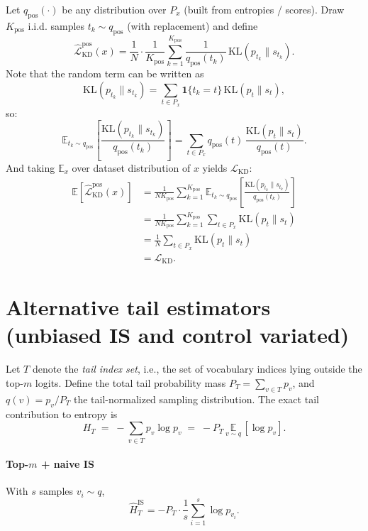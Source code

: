 \documentclass[11pt]{article}
\begin{document}
Let \(q_{\text{pos}}(\cdot)\) be any distribution over \(P_x\) (built from entropies / scores).
Draw \(K_{\text{pos}}\) i.i.d. samples \(t_k\sim q_{\text{pos}}\) (with replacement) and define
\[
	\widehat{\mathcal{L}}_{\text{KD}}^{\text{pos}}(x)
	=\frac{1}{N}\cdot\frac{1}{K_{\text{pos}}}\sum_{k=1}^{K_{\text{pos}}}
	\frac{1}{q_{\text{pos}}(t_k)}\,\mathrm{KL}(p_{t_k}\|s_{t_k}).
\]
Note that the random term can be written as
\[
	\mathrm{KL}(p_{t_k}\|s_{t_k})
	=\sum_{t\in P_x}\mathbf{1}\!\{t_k=t\}\,\mathrm{KL}(p_t\|s_t),
\]
so:
\[
	\mathbb{E}_{t_k\sim q_{\text{pos}}}\!\left[
		\frac{\mathrm{KL}(p_{t_k}\|s_{t_k})}{q_{\text{pos}}(t_k)}
		\right]
	= \sum_{t\in P_x} q_{\text{pos}}(t)\,
	\frac{\mathrm{KL}(p_t\|s_t)}{q_{\text{pos}}(t)}.
\]
And taking \(\mathbb{E}_x\) over dataset distribution of \(x\) yields \(\mathcal{L}_{\text{KD}}\):
\begin{align*}
	\mathbb{E}\!\left[\widehat{\mathcal{L}}_{\text{KD}}^{\text{pos}}(x)\right]
	 & = \frac{1}{N K_{\text{pos}}}\sum_{k=1}^{K_{\text{pos}}}
	\mathbb{E}_{t_k\sim q_{\text{pos}}}\!\left[
		\frac{\mathrm{KL}(p_{t_k}\|s_{t_k})}{q_{\text{pos}}(t_k)}
	\right]                                                    \\
	 & = \frac{1}{N K_{\text{pos}}}\sum_{k=1}^{K_{\text{pos}}}
	\sum_{t\in P_x}\mathrm{KL}(p_t\|s_t)                       \\
	 & = \frac{1}{N}\sum_{t\in P_x}\mathrm{KL}(p_t\|s_t)       \\
	 & =\mathcal{L}_{\text{KD}}.
\end{align*}

\section{Alternative tail estimators (unbiased IS and control variated)}
\label{app:tail-IS}
Let \(T\) denote the \emph{tail index set}, i.e., the set of vocabulary indices lying outside the top-\(m\) logits.
Define the total tail probability mass $P_T=\sum_{v\in T}p_v$, and $q(v)=p_v/P_T$ the tail-normalized sampling distribution. The exact tail contribution to entropy is
\[
	H_T \;=\; -\sum_{v\in T} p_v \log p_v \;=\; -P_T\,\underset{v\sim q}{\mathbb{E}}\,[\log p_v].
\]
\paragraph{Top-$m$ + naive IS} With $s$ samples $v_i\!\sim q$,
\[
	\widehat{H}_T^{\text{IS}}
	= -P_T \cdot \frac{1}{s}\sum_{i=1}^s \log p_{v_i}.
\]
\end{document}
